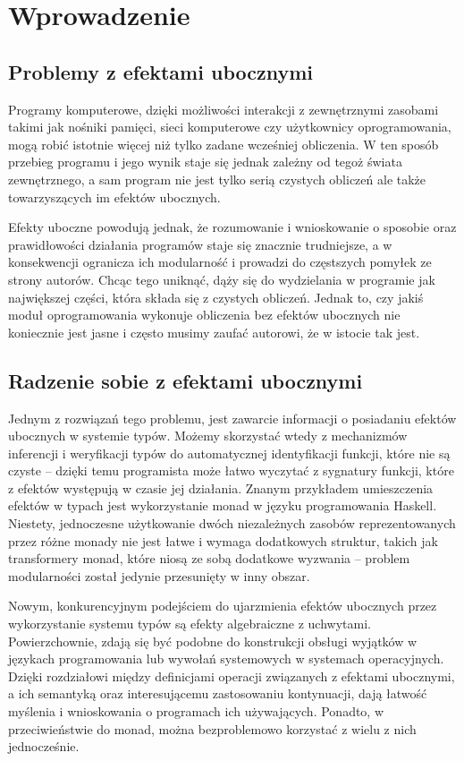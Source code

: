 \chapter{Wprowadzenie}

\section{Problemy z efektami ubocznymi}

Programy komputerowe, dzięki możliwości interakcji z zewnętrznymi zasobami takimi jak nośniki pamięci, sieci komputerowe czy użytkownicy oprogramowania, mogą robić istotnie więcej niż tylko zadane wcześniej obliczenia. W ten sposób przebieg programu i jego wynik staje się jednak zależny od tegoż świata zewnętrznego, a sam program nie jest tylko serią czystych obliczeń ale także towarzyszących im efektów ubocznych.


Efekty uboczne powodują jednak, że rozumowanie i wnioskowanie o sposobie oraz prawidłowości działania programów staje się znacznie trudniejsze, a w konsekwencji ogranicza ich modularność i prowadzi do częstszych pomyłek ze strony autorów. Chcąc tego uniknąć, dąży się do wydzielania w programie jak największej części, która składa się z czystych obliczeń. Jednak to, czy jakiś moduł oprogramowania wykonuje obliczenia bez efektów ubocznych nie koniecznie jest jasne i często musimy zaufać autorowi, że w istocie tak jest.

\section{Radzenie sobie z efektami ubocznymi}

Jednym z rozwiązań tego problemu, jest zawarcie informacji o posiadaniu efektów ubocznych w systemie typów. Możemy skorzystać wtedy z mechanizmów inferencji i weryfikacji typów do automatycznej identyfikacji funkcji, które nie są czyste -- dzięki temu programista może łatwo wyczytać z sygnatury funkcji, które z efektów występują w czasie jej działania. Znanym przykładem umieszczenia efektów w typach jest wykorzystanie monad w języku programowania Haskell. Niestety, jednoczesne użytkowanie dwóch niezależnych zasobów reprezentowanych przez różne monady nie jest łatwe i wymaga dodatkowych struktur, takich jak transformery monad, które niosą ze sobą dodatkowe wyzwania -- problem modularności został jedynie przesunięty w inny obszar.

Nowym, konkurencyjnym podejściem do ujarzmienia efektów ubocznych przez wykorzystanie systemu typów są efekty algebraiczne z uchwytami. Powierzchownie, zdają się być podobne do konstrukcji obsługi wyjątków w językach programowania lub wywołań systemowych w systemach operacyjnych. Dzięki rozdziałowi między definicjami operacji związanych z efektami ubocznymi, a ich semantyką oraz interesującemu zastosowaniu kontynuacji, dają łatwość myślenia i wnioskowania o programach ich używających. Ponadto, w przeciwieństwie do monad, można bezproblemowo korzystać z wielu z nich jednocześnie.

